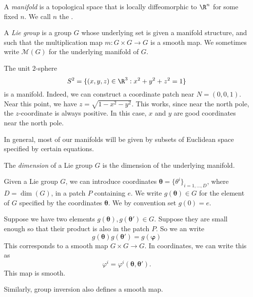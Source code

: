 \documentclass[a4paper]{article}
\begin{document}
\begin{defi}[Manifold] %
  A \emph{manifold} is a topological space that is locally diffeomorphic to $\R^n$ for some fixed $n$. We call $n$ the .
\end{defi}

\begin{defi}
  A \emph{Lie group} is a group $G$ whose underlying set is given a manifold structure, and such that the multiplication map $m: G \times G \to G$ is a smooth map. We sometimes write $\mathcal{M}(G)$ for the underlying manifold of $G$.
\end{defi}

\begin{eg}
  The unit $2$-sphere
  \[
    S^2 = \{(x, y, z) \in \R^3: x^2 + y^2 + z^2 = 1\}
  \]
  is a manifold. Indeed, we can construct a coordinate patch near $N = (0, 0, 1)$. Near this point, we have $z = \sqrt{1 - x^2 - y^2}$. This works, since near the north pole, the $z$-coordinate is always positive. In this case, $x$ and $y$ are good coordinates near the north pole.
\end{eg}

In general, most of our manifolds will be given by subsets of Euclidean space specified by certain equations.

\begin{defi}
  The \emph{dimension} of a Lie group $G$ is the dimension of the underlying manifold.
\end{defi}

Given a Lie group $G$, we can introduce coordinates $\boldsymbol\theta = \{\theta^i\}_{i = 1, \ldots, D}$, where $D = \dim(G)$, in a patch $P$ containing $e$. We write $g(\boldsymbol\theta) \in G$ for the element of $G$ specified by the coordinates $\boldsymbol\theta$. We by convention set $g(0) = e$.

Suppose we have two elements $g(\boldsymbol\theta), g(\boldsymbol\theta') \in G$. Suppose they are small enough so that their product is also in the patch $P$. So we an write
\[
  g(\boldsymbol\theta) g(\boldsymbol\theta') = g(\boldsymbol\varphi)
\]
This corresponds to a smooth map $G \times G \to G$. In coordinates, we can write this as
\[
  \varphi^i = \varphi^i(\boldsymbol\theta, \boldsymbol\theta').
\]
This map is smooth.

Similarly, group inversion also defines a smooth map.
\end{document}

